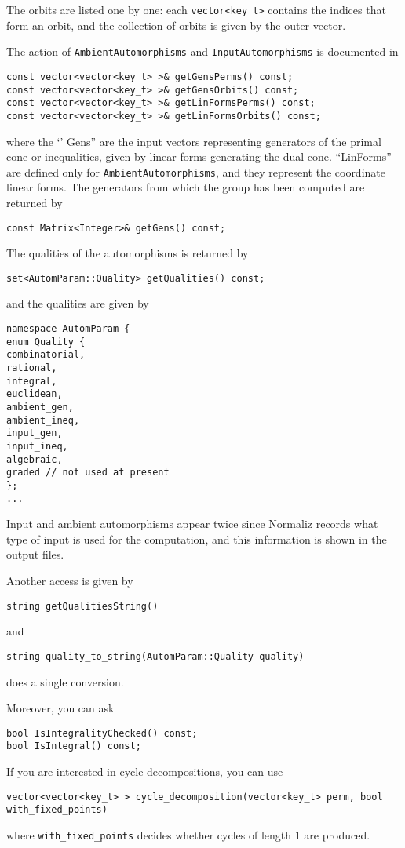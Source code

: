 \begin{small}
The orbits are listed one by one: each \verb|vector<key_t>| contains the indices that form an orbit, and the collection of orbits is given by the outer vector.

The action  of \verb|AmbientAutomorphisms| and \verb|InputAutomorphisms| is documented in
\begin{Verbatim}
const vector<vector<key_t> >& getGensPerms() const;
const vector<vector<key_t> >& getGensOrbits() const;
const vector<vector<key_t> >& getLinFormsPerms() const;
const vector<vector<key_t> >& getLinFormsOrbits() const; 
\end{Verbatim}
where the `' Gens'' are the input vectors representing generators of the primal cone or inequalities, given by linear forms  generating the dual cone. ``LinForms'' are defined only for \verb|AmbientAutomorphisms|, and they represent the coordinate linear forms. The generators from which the group has been computed are returned by
\begin{Verbatim}
const Matrix<Integer>& getGens() const;
\end{Verbatim}

The qualities of the automorphisms is returned by
\begin{Verbatim}
set<AutomParam::Quality> getQualities() const;
\end{Verbatim}
and the qualities are given by
\begin{Verbatim} 
namespace AutomParam {
enum Quality {
combinatorial,
rational,
integral,
euclidean,
ambient_gen,
ambient_ineq,
input_gen,
input_ineq,
algebraic,
graded // not used at present
};
...
\end{Verbatim}
Input and ambient automorphisms appear twice since Normaliz records what type of input is used for the computation, and this information is shown in the output files.

Another access is given by
\begin{Verbatim}
string getQualitiesString()
\end{Verbatim}
and
\begin{Verbatim}
string quality_to_string(AutomParam::Quality quality)
\end{Verbatim}
does a single conversion.

Moreover, you can ask
\begin{Verbatim}
bool IsIntegralityChecked() const;
bool IsIntegral() const;
\end{Verbatim}

If you are interested in cycle decompositions, you can use
\begin{Verbatim}
vector<vector<key_t> > cycle_decomposition(vector<key_t> perm, bool with_fixed_points)
\end{Verbatim}
where \verb|with_fixed_points| decides whether cycles of length $1$ are produced.


\end{small}
